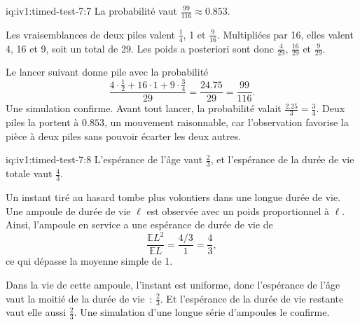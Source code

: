 \begin{solution}{iq:iv1:timed-test-7:7}
La probabilité vaut $\frac{99}{116} \approx 0.853$.

Les vraisemblances de deux piles valent $\frac14$, 1 et $\frac{9}{16}$. Multipliées par 16, elles valent 4, 16 et 9, soit un total de 29. Les poids a posteriori sont donc $\frac{4}{29}$, $\frac{16}{29}$ et $\frac{9}{29}$.

Le lancer suivant donne pile avec la probabilité
\[
\frac{4 \cdot \frac12 + 16 \cdot 1 + 9 \cdot \frac34}{29} = \frac{24.75}{29} = \frac{99}{116}.
\]
Une simulation confirme. Avant tout lancer, la probabilité valait $\frac{2.25}{3} = \frac34$. Deux piles la portent à $0.853$, un mouvement raisonnable, car l'observation favorise la pièce à deux piles sans pouvoir écarter les deux autres.


\end{solution}

\enlargethispage{-4\baselineskip}%
\begin{solution}{iq:iv1:timed-test-7:8}
L'espérance de l'âge vaut $\frac23$, et l'espérance de la durée de vie totale vaut $\frac43$.

Un instant tiré au hasard tombe plus volontiers dans une longue durée de vie. Une ampoule de durée de vie $\ell$ est observée avec un poids proportionnel à $\ell$. Ainsi, l'ampoule en service a une espérance de durée de vie de
\[
\frac{\mathbb{E}L^2}{\mathbb{E}L} = \frac{4/3}{1} = \frac43,
\]
ce qui dépasse la moyenne simple de 1.

Dans la vie de cette ampoule, l'instant est uniforme, donc l'espérance de l'âge vaut la moitié de la durée de vie~: $\frac23$. Et l'espérance de la durée de vie restante vaut elle aussi $\frac23$. Une simulation d'une longue série d'ampoules le confirme.


\end{solution}

